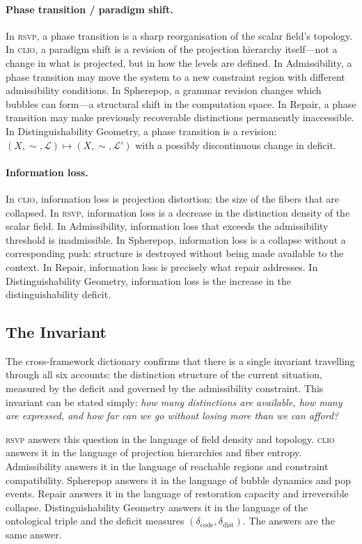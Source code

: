 \documentclass[12pt, letterpaper]{article}
\theoremstyle{remark}
\newcommand{\rsvp}{\textsc{rsvp}}
\newcommand{\clio}{\textsc{clio}}
\newcommand{\Dc}{\delta_{\mathrm{code}}}
\newcommand{\Dd}{\delta_{\mathrm{dist}}}
\begin{document}
\paragraph{Phase transition / paradigm shift.}
In \rsvp{}, a phase transition is a sharp reorganisation of the scalar
field's topology.  In \clio{}, a paradigm shift is a revision of the
projection hierarchy itself---not a change in what is projected, but in how
the levels are defined.  In Admissibility, a phase transition may move the
system to a new constraint region with different admissibility conditions.
In Spherepop, a grammar revision changes which bubbles can form---a
structural shift in the computation space.  In Repair, a phase transition
may make previously recoverable distinctions permanently inaccessible.
In Distinguishability Geometry, a phase transition is a revision:
$(X, {\sim}, \mathcal{L}) \mapsto (X, {\sim}, \mathcal{L}')$ with a
possibly discontinuous change in deficit.

\paragraph{Information loss.}
In \clio{}, information loss is projection distortion: the size of the
fibers that are collapsed.  In \rsvp{}, information loss is a decrease in
the distinction density of the scalar field.  In Admissibility, information
loss that exceeds the admissibility threshold is inadmissible.  In Spherepop,
information loss is a collapse without a corresponding push: structure is
destroyed without being made available to the context.  In Repair, information
loss is precisely what repair addresses.  In Distinguishability Geometry,
information loss is the increase in the distinguishability deficit.

\subsection{The Invariant}

The cross-framework dictionary confirms that there is a single invariant
travelling through all six accounts: the distinction structure of the current
situation, measured by the deficit and governed by the admissibility
constraint.  This invariant can be stated simply: \emph{how many distinctions
are available, how many are expressed, and how far can we go without losing
more than we can afford?}

\rsvp{} answers this question in the language of field density and topology.
\clio{} answers it in the language of projection hierarchies and fiber
entropy.  Admissibility answers it in the language of reachable regions and
constraint compatibility.  Spherepop answers it in the language of bubble
dynamics and pop events.  Repair answers it in the language of restoration
capacity and irreversible collapse.  Distinguishability Geometry answers it
in the language of the ontological triple and the deficit measures $(\Dc, \Dd)$.
The answers are the same answer.
\end{document}

